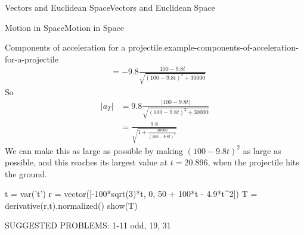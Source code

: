 \documentclass[10pt,]{book}
\numberwithin{equation}{section}
\begin{document}
\begin{chapterptx}{Vectors and Euclidean Space}{}{Vectors and Euclidean Space}{}{}
\begin{sectionptx}{Motion in Space}{}{Motion in Space}{}{}
\begin{example}{Components of acceleration for a projectile.}{example-components-of-acceleration-for-a-projectile}
\begin{align*}
& =  -9.8\frac{100 - 9.8t}{\sqrt{(100-9.8t)^{2}+30000}}
\end{align*}
\hypertarget{p-1107}{}%
So%
%
\begin{align*}
|a_{T}| & = 9.8\frac{|100 - 9.8t|}{\sqrt{(100-9.8t)^{2}+30000}} \\
& = \frac{9.8}{\sqrt{1+\frac{30000}{(100-9.8t)^{2}}}} 
\end{align*}
\hypertarget{p-1108}{}%
We can make this as large as possible by making \((100-9.8t)^{2}\) as large as possible, and this reaches its largest value at \(t = 20.896\), when the projectile hits the ground.%
\end{example}
\begin{sageinput}
t = var('t')
r = vector([-100*sqrt(3)*t, 0, 50 + 100*t - 4.9*t^2])
T = derivative(r,t).normalized()
show(T)
\end{sageinput}
\hypertarget{p-1109}{}%
SUGGESTED PROBLEMS: 1-11 odd, 19, 31%
\end{sectionptx}
\end{chapterptx}
%
%
\typeout{************************************************}
\typeout{************************************************}
%
\end{document}
